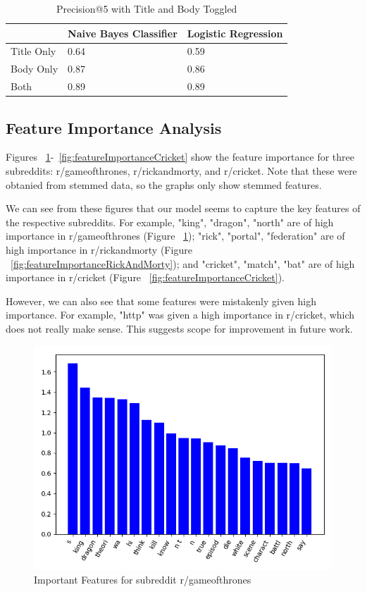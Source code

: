 \documentclass{sig-alternate-05-2015}
\begin{document}
\begin{table}[H]
\begin{tabular}{|l|l|l|}
\hline
           & Naive Bayes Classifier & Logistic Regression \\ \hline
Title Only & 0.64                   & 0.59                \\ \hline
Body Only  & 0.87                   & 0.86                \\ \hline
Both       & 0.89                   & 0.89                \\ \hline
\end{tabular}
\caption{Precision@5 with Title and Body Toggled}
\label{table:titleBodyToggled}
\end{table}

\subsection{Feature Importance Analysis}

Figures ~\ref{fig:featureImportanceGOT}-~\ref{fig:featureImportanceCricket} show the feature importance for three subreddits: r/gameofthrones, r/rickandmorty, and r/cricket. Note that these were obtanied from stemmed data, so the graphs only show stemmed features. 

We can see from these figures that our model seems to capture the key features of the respective subreddits. For example, "king", "dragon", "north" are of high importance in r/gameofthrones (Figure ~\ref{fig:featureImportanceGOT}); "rick", "portal", "federation" are of high importance in r/rickandmorty (Figure ~\ref{fig:featureImportanceRickAndMorty}); and "cricket", "match", "bat" are of high importance in r/cricket (Figure ~\ref{fig:featureImportanceCricket}). 

However, we can also see that some features were mistakenly given high importance. For example, "http" was given a high importance in r/cricket, which does not really make sense. This suggests scope for improvement in future work.

\begin{figure}[H]
\centering
\includegraphics[width=\linewidth]{plots/coefficients-gameofthrones-dim-337.png}
\caption{Important Features for subreddit r/gameofthrones}
\label{fig:featureImportanceGOT}
\end{figure}
\end{document}
